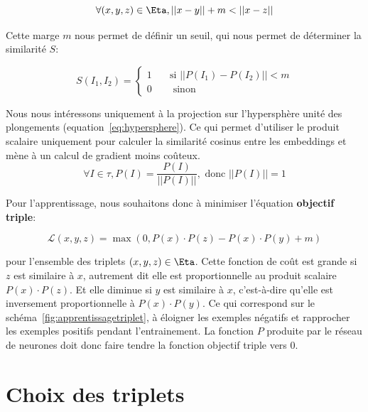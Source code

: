 \begin{equation}
\forall (x,y,z) \in \Eta, ||x - y|| + m < ||x - z|| 
\label{eq:objectif}
\end{equation}

Cette marge $m$ nous permet de définir un seuil, qui nous permet de déterminer la similarité $S$:

\begin{equation}
S(I_1, I_2) = 
  \begin{cases}
   1       & \quad \text{si } || P(I_1) - P(I_2) || < m\\
   0  & \quad \text{ sinon }
  \end{cases} 
\label{eq:simmargin}
\end{equation}



Nous nous intéressons uniquement à la projection sur l'hypersphère unité des plongements (equation~\ref{eq:hypersphere}). 
Ce qui permet d'utiliser le produit scalaire uniquement pour calculer la similarité cosinus entre les embeddings et mène à un calcul de gradient moins coûteux.
\begin{equation}
\forall I \in \tau, P(I) = \frac{P(I)}{||P(I)||},\text{ donc }||P(I)|| = 1
\label{eq:hypersphere}
\end{equation}
 

Pour l'apprentissage, nous souhaitons donc à minimiser l'équation \textbf{objectif triple}:

\begin{equation}
\mathcal{L}(x,y,z) =  \max(0, P(x) \cdot P(z) - P(x) \cdot P(y) + m)
\label{eq:losstriple}
\end{equation}

pour l'ensemble des triplets $(x,y,z) \in \Eta$. 
Cette fonction de coût est grande si $z$ est similaire à $x$, autrement dit elle est proportionnelle au produit scalaire $P(x)\cdot P(z)$.
Et elle diminue si $y$ est similaire à $x$, c'est-à-dire qu'elle est inversement proportionnelle à $P(x)\cdot P(y)$.
Ce qui correspond sur le schéma~\ref{fig:apprentissagetriplet}, à éloigner les exemples négatifs et rapprocher les exemples positifs pendant l'entrainement.
La fonction $P$ produite par le réseau de neurones doit donc faire tendre la fonction objectif triple vers 0.




\section{Choix des triplets}

